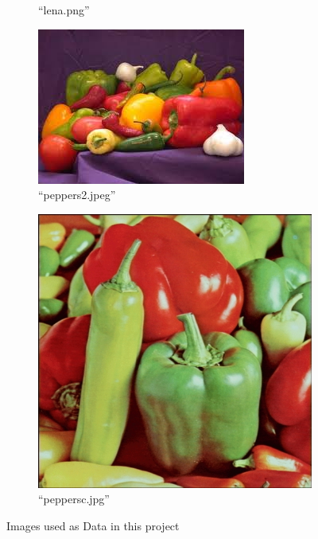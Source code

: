 \documentclass[sigconf,authorversion]{acmart}
\begin{document}
\begin{figure}[hbtp]
\begin{subfigure}[b]{0.45\columnwidth}
      \caption{``lena.png''}
      \label{subfig:lena}
  \end{subfigure}
  \hspace{0.01\textwidth}
  \begin{subfigure}[b]{0.45\columnwidth}
    \includegraphics[width=\columnwidth]{../imgs/peppers2.jpeg}
    \caption{``peppers2.jpeg''}
    \label{subfig:baboon}
  \end{subfigure}
  \hspace{0.01\textwidth}
  \begin{subfigure}[b]{0.45\columnwidth}
      \includegraphics[width=\columnwidth]{../imgs/peppersc.jpg}
      \caption{``peppersc.jpg''}
      \label{subfig:lena}
  \end{subfigure}
  \caption{Images used as Data in this project}
  \label{fig:original}
\end{figure}
\end{document}

